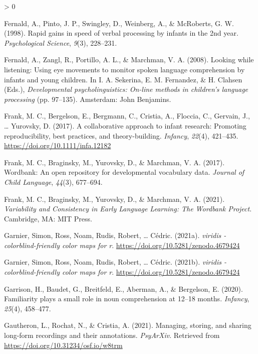 \documentclass[
  english,
  man,floatsintext]{apa6}
\newlength{\cslhangindent}
\newenvironment{CSLReferences}[2] %
 {%
  \setlength{\parindent}{0pt}
  \ifodd #1 \everypar{\setlength{\hangindent}{\cslhangindent}}\ignorespaces\fi
  \ifnum #2 > 0
  \setlength{\parskip}{#2\baselineskip}
  \fi
 }%
 {}
\begin{document}
\begin{CSLReferences}{1}{0}
\leavevmode\hypertarget{ref-fernald1998}{}%
Fernald, A., Pinto, J. P., Swingley, D., Weinberg, A., \& McRoberts, G. W. (1998). Rapid gains in speed of verbal processing by infants in the 2nd year. \emph{Psychological Science}, \emph{9}(3), 228--231.

\leavevmode\hypertarget{ref-fernald2008}{}%
Fernald, A., Zangl, R., Portillo, A. L., \& Marchman, V. A. (2008). {Looking while listening: Using eye movements to monitor spoken language comprehension by infants and young children}. In I. A. Sekerina, E. M. Fernandez, \& H. Clahsen (Eds.), \emph{Developmental psycholinguistics: On-line methods in children's language processing} (pp. 97--135). Amsterdam: John Benjamins.

\leavevmode\hypertarget{ref-Frank2017a}{}%
Frank, M. C., Bergelson, E., Bergmann, C., Cristia, A., Floccia, C., Gervain, J., \ldots{} Yurovsky, D. (2017). {A collaborative approach to infant research: Promoting reproducibility, best practices, and theory-building}. \emph{Infancy}, \emph{22}(4), 421--435. \url{https://doi.org/10.1111/infa.12182}

\leavevmode\hypertarget{ref-frank2017}{}%
Frank, M. C., Braginsky, M., Yurovsky, D., \& Marchman, V. A. (2017). {Wordbank: An open repository for developmental vocabulary data}. \emph{Journal of Child Language}, \emph{44}(3), 677--694.

\leavevmode\hypertarget{ref-frank2021}{}%
Frank, M. C., Braginsky, M., Yurovsky, D., \& Marchman, V. A. (2021). \emph{{Variability and Consistency in Early Language Learning: The Wordbank Project}}. Cambridge, MA: MIT Press.

\leavevmode\hypertarget{ref-R-viridis}{}%
Garnier, Simon, Ross, Noam, Rudis, Robert, \ldots{} Cédric. (2021a). \emph{{viridis} - colorblind-friendly color maps for r}. \url{https://doi.org/10.5281/zenodo.4679424}

\leavevmode\hypertarget{ref-R-viridisLite}{}%
Garnier, Simon, Ross, Noam, Rudis, Robert, \ldots{} Cédric. (2021b). \emph{{viridis} - colorblind-friendly color maps for r}. \url{https://doi.org/10.5281/zenodo.4679424}

\leavevmode\hypertarget{ref-Garrison2020}{}%
Garrison, H., Baudet, G., Breitfeld, E., Aberman, A., \& Bergelson, E. (2020). {Familiarity plays a small role in noun comprehension at 12--18 months}. \emph{Infancy}, \emph{25}(4), 458--477.

\leavevmode\hypertarget{ref-gautheron_2021}{}%
Gautheron, L., Rochat, N., \& Cristia, A. (2021). Managing, storing, and sharing long-form recordings and their annotations. \emph{PsyArXiv}. Retrieved from \url{https://doi.org/10.31234/osf.io/w8trm}


\end{CSLReferences}
\end{document}
